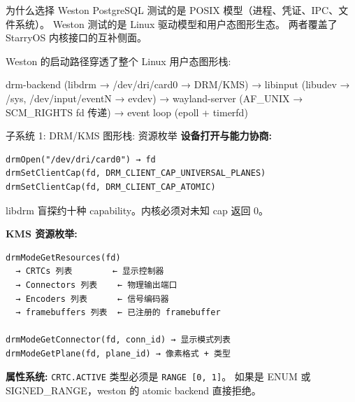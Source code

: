 \documentclass[aspectratio=169,10pt]{ctexbeamer}
\begin{document}
\begin{frame}[shrink=25]{为什么选择 Weston}
PostgreSQL 测试的是 POSIX 模型（进程、凭证、IPC、文件系统）。
Weston 测试的是 Linux 驱动模型和用户态图形生态。
两者覆盖了 StarryOS 内核接口的互补侧面。

\vspace{1mm}

\vspace{1mm}
Weston 的启动路径穿透了整个 Linux 用户态图形栈:

drm-backend (libdrm → /dev/dri/card0 → DRM/KMS) →
libinput (libudev → /sys, /dev/input/eventN → evdev) →
wayland-server (AF\_UNIX → SCM\_RIGHTS fd 传递) →
event loop (epoll + timerfd)
\end{frame}


\begin{frame}[fragile,shrink=20]{子系统 1: DRM/KMS 图形栈: 资源枚举}
\small
\textbf{设备打开与能力协商:}

\begin{verbatim}
drmOpen("/dev/dri/card0") → fd
drmSetClientCap(fd, DRM_CLIENT_CAP_UNIVERSAL_PLANES)
drmSetClientCap(fd, DRM_CLIENT_CAP_ATOMIC)
\end{verbatim}

libdrm 盲探约十种 capability。内核必须对未知 cap 返回 0。

\vspace{1mm}
\textbf{KMS 资源枚举:}

\begin{verbatim}
drmModeGetResources(fd)
  → CRTCs 列表        ← 显示控制器
  → Connectors 列表    ← 物理输出端口
  → Encoders 列表      ← 信号编码器
  → framebuffers 列表  ← 已注册的 framebuffer

drmModeGetConnector(fd, conn_id) → 显示模式列表
drmModeGetPlane(fd, plane_id) → 像素格式 + 类型
\end{verbatim}

\vspace{1mm}
\textbf{属性系统:} \texttt{CRTC.ACTIVE} 类型必须是 \texttt{RANGE [0, 1]}。
如果是 ENUM 或 SIGNED\_RANGE，weston 的 atomic backend 直接拒绝。
\end{frame}
\end{document}
